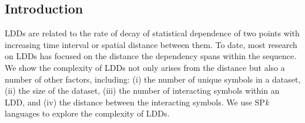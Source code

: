 \documentclass[a0,portrait]{a0poster}
\begin{document}
\begin{multicols}{2}
\selectfont


%
%


\color{tudLogoColor}

\section*{Introduction}

\color{black}
LDDs are related to the rate of decay of statistical dependence of two points with increasing time interval or spatial distance between them. To date, most research on LDDs has focused on the distance the dependency spans within the sequence. We show the complexity of LDDs not only arises from the distance but also a number of other factors, including: (i) the number of unique symbols in a dataset, (ii) the size of the dataset, (iii) the number of interacting symbols within an LDD, and (iv) the distance between the interacting symbols. We use SP\emph{k} languages to explore the complexity of LDDs.


\end{multicols}
\end{document}
